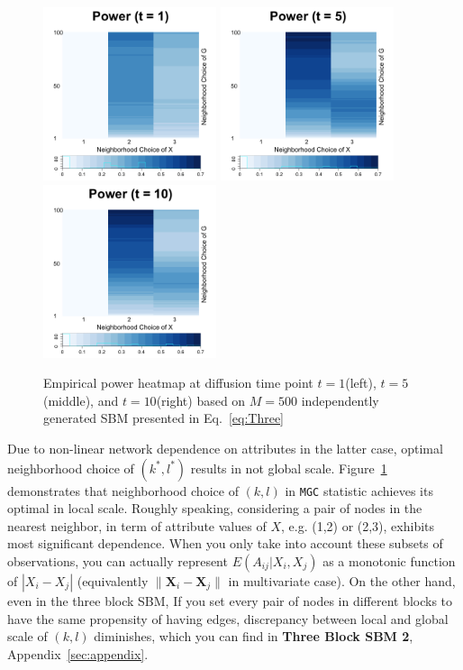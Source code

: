 \documentclass[12pt]{article}
\theoremstyle{definition}
\begin{document}
\begin{figure}[H]
	\centering
	\includegraphics[width=2in]{../Figure/ThreeSBM_power1.png}
	\includegraphics[width=2in]{../Figure/ThreeSBM_power5.png}
	\includegraphics[width=2in]{../Figure/ThreeSBM_power10.png}
	\caption{Empirical power heatmap at diffusion time point $t=1$(left), $t=5$(middle), and $t=10$(right) based on $M = 500$ independently generated SBM presented in Eq.~\ref{eq:Three}}
	\label{fig:ThreeSBM_power}
\end{figure}
Due to non-linear network dependence on attributes in the latter case, optimal neighborhood choice of $(k^{*}, l^{*})$ results in not global scale.  Figure~\ref{fig:ThreeSBM_power} demonstrates that neighborhood choice of $(k,l)$ in \texttt{MGC} statistic achieves its optimal in local scale. Roughly speaking, considering a pair of nodes in the nearest neighbor, in term of attribute values of $X$, e.g. (1,2) or (2,3), exhibits most significant dependence. When you only take into account these subsets of observations, you can actually represent $E(A_{ij} | X_{i}, X_{j})$ as a monotonic function of $|X_{i} - X_{j}|$ (equivalently $\parallel \mathbf{X}_{i} - \mathbf{X}_{j} \parallel$ in multivariate case). On the other hand, even in the three block SBM, If you set every pair of nodes in different blocks to have the same propensity of having edges, discrepancy between local and global scale of $(k,l)$ diminishes, which you can find in \textbf{Three Block SBM 2}, Appendix~\ref{sec:appendix}.
\end{document}
